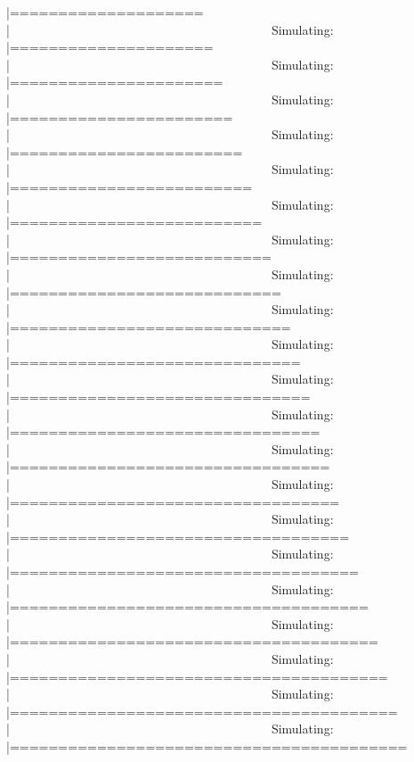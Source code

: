 \documentclass[]{article}
\newenvironment{Shaded}{\begin{snugshade}}{\end{snugshade}}
\theoremstyle{definition}
\theoremstyle{definition}
\theoremstyle{definition}
\theoremstyle{remark}
\begin{document}
\begin{Shaded}
\begin{Highlighting}[]
|====================                                         |Simulating: |=====================                                        |Simulating: |======================                                       |Simulating: |=======================                                      |Simulating: |========================                                     |Simulating: |=========================                                    |Simulating: |==========================                                   |Simulating: |===========================                                  |Simulating: |============================                                 |Simulating: |=============================                                |Simulating: |==============================                               |Simulating: |===============================                              |Simulating: |================================                             |Simulating: |=================================                            |Simulating: |==================================                           |Simulating: |===================================                          |Simulating: |====================================                         |Simulating: |=====================================                        |Simulating: |======================================                       |Simulating: |=======================================                      |Simulating: |========================================                     |Simulating: |=========================================                    
\end{Highlighting}
\end{Shaded}
\end{document}
